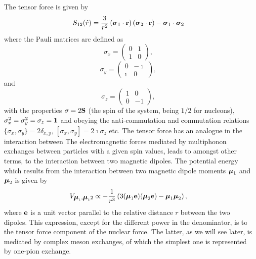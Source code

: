\begin{enumerate}
The tensor force is given by
\[
S_{12} (\hat r) = \frac{3}{r^2}\left(\mbox{\boldmath $\sigma$}_1\cdot {\bf r}\right) \left(\mbox{\boldmath $\sigma$}_2\cdot {\bf r}\right) -\mbox{\boldmath $\sigma$}_1\cdot\mbox{\boldmath $\sigma$}_2\]
where the Pauli matrices are defined as
\[
\sigma_x =\begin{pmatrix} 0 & 1 \\ 1 & 0 \end{pmatrix},
\]
\[
\sigma_y =\begin{pmatrix} 0 & -\imath \\ \imath & 0 \end{pmatrix},
\]
and
\[
\sigma_z =\begin{pmatrix} 1 & 0 \\ 0 & -1 \end{pmatrix},
\]
with the properties $\sigma = 2{\bf S}$ (the spin of the system, being $1/2$ for nucleons), 
$\sigma^2_x=\sigma^2_y=\sigma_z={\bf 1}$ and
obeying the anti-commutation and commutation relations $\{\sigma_x,\sigma_y\} =2\delta_{x,y}$, 
$[\sigma_x,\sigma_y] =2\imath\sigma_z$ etc. 
The tensor force has an analogue in the interaction between 
The electromagnetic forces mediated by multiphonon exchanges between particles with a given spin values, leads to
amongst other terms, to the interaction between two magnetic dipoles. 
The potential energy which results from the interaction
between two magnetic dipole moments $\mbox{\boldmath $\mu$}_1$ and  $\mbox{\boldmath $\mu$}_2$  is given by
\[
V_{\mbox{\boldmath $\mu$}_1,\mbox{\boldmath $\mu$}_12} \propto -\frac{1}{r^3}\left(3(\mbox{\boldmath $\mu$}_1{\bf e})(\mbox{\boldmath $\mu$}_2{\bf e})-
\mbox{\boldmath $\mu$}_1\mbox{\boldmath $\mu$}_2\right),
\]
where ${\bf e}$ is a unit vector parallel to the relative distance $r$ between  the two dipoles.  
This expression, except for the different power in the denominator, is to the tensor force component of the nuclear force. The latter, as we will see later, is mediated by complex meson exchanges, of which the simplest one is represented by one-pion exchange. 
 

\end{enumerate}
